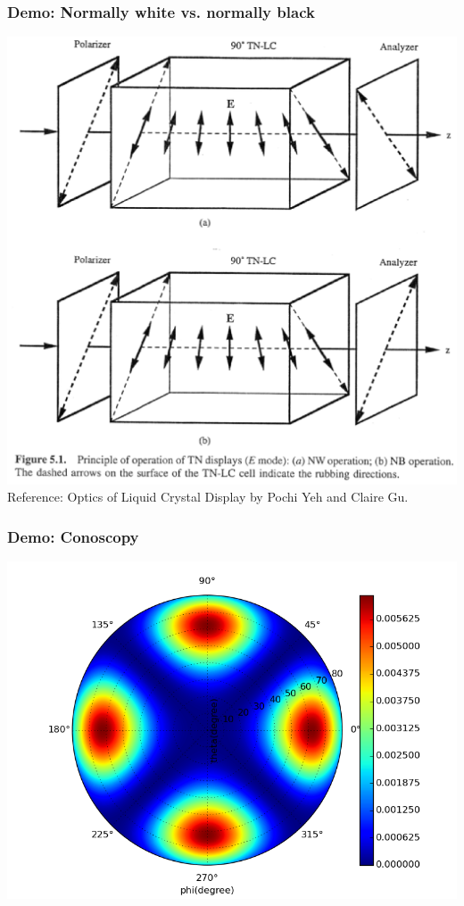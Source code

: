 \documentclass{beamer}
\begin{document}
\begin{frame}
\frametitle{Demo: Normally white vs. normally black}
\begin{center}
\includegraphics[scale=0.4]{TN_NW_NB.eps}\\
Reference: Optics of Liquid Crystal Display by Pochi Yeh and Claire Gu.
\end{center}
\end{frame}
\begin{frame}
\frametitle{Demo: Conoscopy}
\begin{center}
\includegraphics[scale=0.4]{conoscopy.png}
\end{center}
\end{frame}
\end{document}
